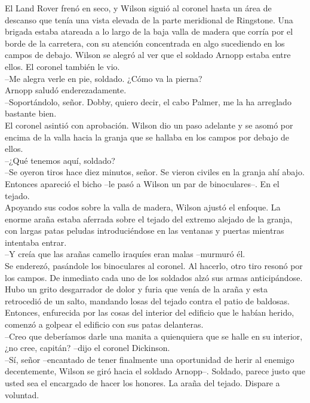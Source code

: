 El Land Rover frenó en seco, y Wilson siguió al coronel hasta un área de
descanso que tenía una vista elevada de la parte meridional de
Ringstone. Una brigada estaba atareada a lo largo de la baja valla de
madera que corría por el borde de la carretera, con su atención
concentrada en algo sucediendo en los campos de debajo. Wilson se alegró
al ver que el soldado Arnopp estaba entre ellos. El coronel también le
vio.\\
--Me alegra verle en pie, soldado. ¿Cómo va la pierna?\\
Arnopp saludó enderezadamente.\\
--Soportándolo, señor. Dobby, quiero decir, el cabo Palmer, me la ha
arreglado bastante bien.\\
El coronel asintió con aprobación. Wilson dio un paso adelante y se
asomó por encima de la valla hacia la granja que se hallaba en los
campos por debajo de ellos.\\
--¿Qué tenemos aquí, soldado?\\
--Se oyeron tiros hace diez minutos, señor. Se vieron civiles en la
granja ahí abajo. Entonces apareció el bicho --le pasó a Wilson un par
de binoculares--. En el tejado.\\
Apoyando sus codos sobre la valla de madera, Wilson ajustó el enfoque.
La enorme araña estaba aferrada sobre el tejado del extremo alejado de
la granja, con largas patas peludas introduciéndose en las ventanas y
puertas mientras intentaba entrar.\\
--Y creía que las arañas camello iraquíes eran malas --murmuró él.\\
Se enderezó, pasándole los binoculares al coronel. Al hacerlo, otro tiro
resonó por los campos. De inmediato cada uno de los soldados alzó sus
armas anticipándose. Hubo un grito desgarrador de dolor y furia que
venía de la araña y esta retrocedió de un salto, mandando losas del
tejado contra el patio de baldosas. Entonces, enfurecida por las cosas
del interior del edificio que le habían herido, comenzó a golpear el
edificio con sus patas delanteras.\\
--Creo que deberíamos darle una manita a quienquiera que se halle en su
interior, ¿no cree, capitán? --dijo el coronel Dickinson.\\
--Sí, señor --encantado de tener finalmente una oportunidad de herir al
enemigo decentemente, Wilson se giró hacia el soldado Arnopp--. Soldado,
parece justo que usted sea el encargado de hacer los honores. La araña
del tejado. Dispare a voluntad.\\
